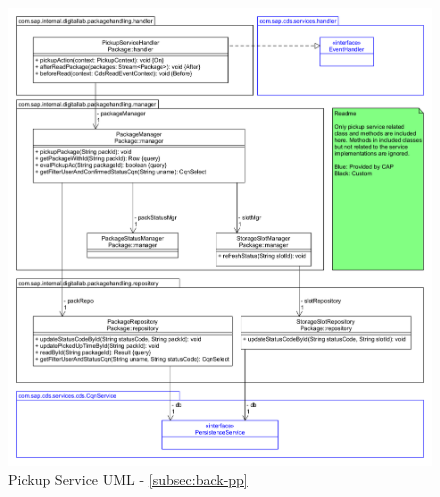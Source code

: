\begin{figure}[!htb]
    \centering
    \includegraphics[width=1\linewidth]{images/service_class_diagrams/pickup_service_class_diagram.png}
    \caption{Pickup Service UML - \autoref{subsec:back-pp}}
    \label{fig:pickup_service_uml}
\end{figure}


